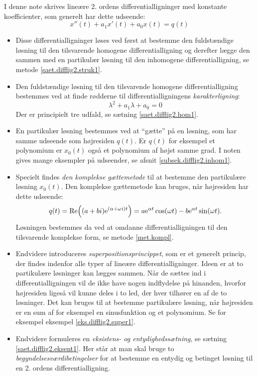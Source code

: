 \begin{summary}
I denne note skrives lineære 2. ordens differentialligninger med konstante koefficienter, som generelt har dette udseende:
\begin{equation}
x''(t) + a_1 x'(t) + a_0 x(t) = q(t)
\end{equation}
\begin{itemize}
\item Disse differentialligninger løses ved først at bestemme den fuldstændige løsning til den tilsvarende homogene differentialligning og derefter lægge den sammen med en partikulær løsning til den inhomogene differentialligning, se metode \ref{saet.difflig2.struk1}.
\item Den fuldstændige løsning til den tilsvarende homogene differentialligning bestemmes ved at finde rødderne til differentialligningens \textit{karakterligning}:
\begin{equation}
\lambda^2 + a_1 \lambda + a_0 = 0
\end{equation}
Der er principielt tre udfald, se sætning \ref{saet.difflig2.hom1}.
\item En partikulær løsning bestemmes ved at ``gætte'' på en løsning, som har samme udseende som højresiden $ q(t) $. Er $ q(t) $ for eksempel et polynomium er $ x_0(t) $ også et polynomium af højst samme grad. I noten gives mange eksempler på udseender, se afsnit \ref{subsek.difflig2.inhom1}.
\item Specielt findes \textit{den komplekse gættemetode} til at bestemme den partikulære løsning $ x_0(t) $. Den komplekse gættemetode kan bruges, når højresiden har dette udseende:
\begin{equation}
q(t) = \mathrm{Re} \! \left((a+bi) \mathrm{e}^{(\alpha + \omega i)t}\right) = a \mathrm{e}^{\alpha t}\cos(\omega t) - b \mathrm{e}^{\alpha t} \sin(\omega t).
\end{equation}
Løsningen bestemmes da ved at omdanne differentialligningen til den tilsvarende komplekse form, se metode \ref{met.kompl}.
\item Endvidere introduceres \textit{superpositionsprincippet}, som er et generelt princip, der findes indenfor alle typer af lineære differentialligninger. Ideen er at to partikulære løsninger kan lægges sammen. Når de sættes ind i differentialligningen vil de ikke have nogen indflydelse på hinanden, hvorfor højresiden ligeså vil kunne deles i to led, der hver tilhører en af de to løsninger. Det kan bruges til at bestemme partikulære løsning, når højresiden er en sum af for eksempel en sinusfunktion og et polynomium. Se for eksempel eksempel \ref{eks.difflig2.super1}.
\item Endvidere formuleres en \textit{eksistens- og entydighedssætning}, se sætning \ref{saet.difflig2.eksent1}. Her står at man skal bruge to \textit{begyndelsesværdibetingelser} for at bestemme en entydig og betinget løsning til en 2. ordens differentialligning.
\end{itemize}
\end{summary}


